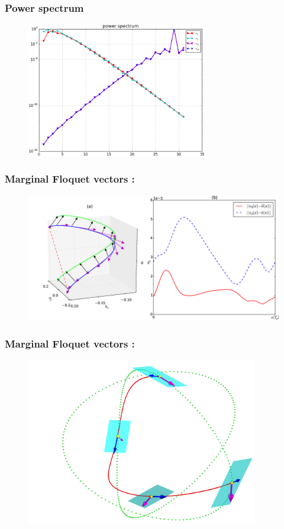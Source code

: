\documentclass[mathserif, handout]{beamer}
\begin{document}
\begin{frame}
  \frametitle{Power spectrum}
  \begin{figure}[h]
    \centering
    \includegraphics[width=0.7\textwidth]{KSpower}
  \end{figure}
\end{frame}

\begin{frame}
  \frametitle{Marginal Floquet vectors : }
    \begin{figure}[h]
    \centering
    \includegraphics[width=1.0\textwidth]{ppo1vectfield2}
  \end{figure}
\end{frame}

\begin{frame}
  \frametitle{Marginal Floquet vectors : }
    \begin{figure}[h]
    \centering
    \includegraphics[width=0.9\textwidth]{rpo1_marginal3}
  \end{figure}
\end{frame}
\end{document}
